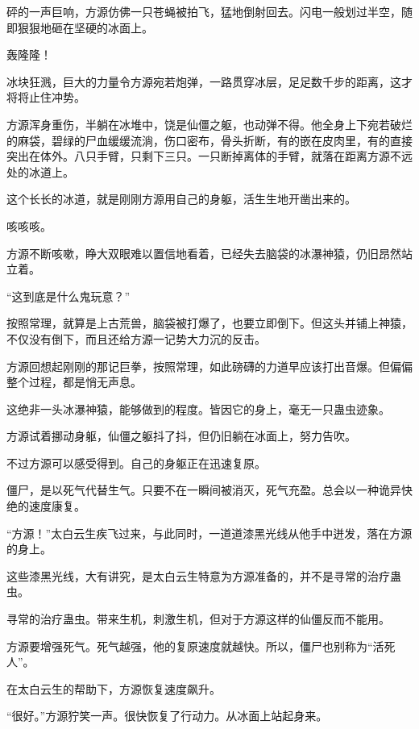
\begin{this_body}



砰的一声巨响，方源仿佛一只苍蝇被拍飞，猛地倒射回去。闪电一般划过半空，随即狠狠地砸在坚硬的冰面上。

轰隆隆！

冰块狂溅，巨大的力量令方源宛若炮弹，一路贯穿冰层，足足数千步的距离，这才将将止住冲势。

方源浑身重伤，半躺在冰堆中，饶是仙僵之躯，也动弹不得。他全身上下宛若破烂的麻袋，碧绿的尸血缓缓流淌，伤口密布，骨头折断，有的嵌在皮肉里，有的直接突出在体外。八只手臂，只剩下三只。一只断掉离体的手臂，就落在距离方源不远处的冰道上。

这个长长的冰道，就是刚刚方源用自己的身躯，活生生地开凿出来的。

咳咳咳。

方源不断咳嗽，睁大双眼难以置信地看着，已经失去脑袋的冰瀑神猿，仍旧昂然站立着。

“这到底是什么鬼玩意？”

按照常理，就算是上古荒兽，脑袋被打爆了，也要立即倒下。但这头并铺上神猿，不仅没有倒下，而且还给方源一记势大力沉的反击。

方源回想起刚刚的那记巨拳，按照常理，如此磅礴的力道早应该打出音爆。但偏偏整个过程，都是悄无声息。

这绝非一头冰瀑神猿，能够做到的程度。皆因它的身上，毫无一只蛊虫迹象。

方源试着挪动身躯，仙僵之躯抖了抖，但仍旧躺在冰面上，努力告吹。

不过方源可以感受得到。自己的身躯正在迅速复原。

僵尸，是以死气代替生气。只要不在一瞬间被消灭，死气充盈。总会以一种诡异快绝的速度康复。

“方源！”太白云生疾飞过来，与此同时，一道道漆黑光线从他手中迸发，落在方源的身上。

这些漆黑光线，大有讲究，是太白云生特意为方源准备的，并不是寻常的治疗蛊虫。

寻常的治疗蛊虫。带来生机，刺激生机，但对于方源这样的仙僵反而不能用。

方源要增强死气。死气越强，他的复原速度就越快。所以，僵尸也别称为“活死人”。

在太白云生的帮助下，方源恢复速度飙升。

“很好。”方源狞笑一声。很快恢复了行动力。从冰面上站起身来。


\end{this_body}
